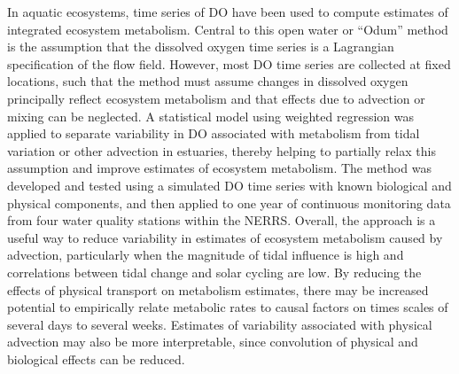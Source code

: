 In aquatic ecosystems, time series of \ac{DO} have been used to compute estimates of integrated ecosystem metabolism.  Central to this open water or ``Odum'' method is the assumption that the dissolved oxygen time series is a Lagrangian specification of the flow field.  However, most \ac{DO} time series are collected at fixed locations, such that the method must assume changes in dissolved oxygen principally reflect ecosystem metabolism and that effects due to advection or mixing can be neglected.  A statistical model using weighted regression was applied to separate variability in \ac{DO} associated with metabolism from tidal variation or other advection in estuaries, thereby helping to partially relax this assumption and improve estimates of ecosystem metabolism. The method was developed and tested using a simulated \ac{DO} time series with known biological and physical components, and then applied to one year of continuous monitoring data from four water quality stations within the \acl*{NERRS}.  Overall, the approach is a useful way to reduce variability in estimates of ecosystem metabolism caused by advection, particularly when the magnitude of tidal influence is high and correlations between tidal change and solar cycling are low. By reducing the effects of physical transport on metabolism estimates, there may be increased potential to empirically relate metabolic rates to causal factors on times scales of several days to several weeks. Estimates of variability associated with physical advection may also be more interpretable, since convolution of physical and biological effects can be reduced.
